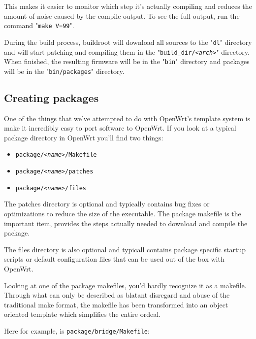 This makes it easier to monitor which step it's actually compiling and reduces the amount
of noise caused by the compile output. To see the full output, run the command
"\texttt{make V=99}".

During the build process, buildroot will download all sources to the "\texttt{dl}"
directory and will start patching and compiling them in the "\texttt{build\_dir/\textit{<arch>}}"
directory. When finished, the resulting firmware will be in the "\texttt{bin}" directory
and packages will be in the "\texttt{bin/packages}" directory.


\subsection{Creating packages}

One of the things that we've attempted to do with OpenWrt's template system is make it
incredibly easy to port software to OpenWrt. If you look at a typical package directory
in OpenWrt you'll find two things:

\begin{itemize}
    \item \texttt{package/\textit{<name>}/Makefile}
    \item \texttt{package/\textit{<name>}/patches}
    \item \texttt{package/\textit{<name>}/files}
\end{itemize}

The patches directory is optional and typically contains bug fixes or optimizations to
reduce the size of the executable. The package makefile is the important item, provides
the steps actually needed to download and compile the package.

The files directory is also optional and typicall contains package specific startup scripts or default configuration files that can be used out of the box with OpenWrt.

Looking at one of the package makefiles, you'd hardly recognize it as a makefile.
Through what can only be described as blatant disregard and abuse of the traditional
make format, the makefile has been transformed into an object oriented template which
simplifies the entire ordeal.

Here for example, is \texttt{package/bridge/Makefile}:

